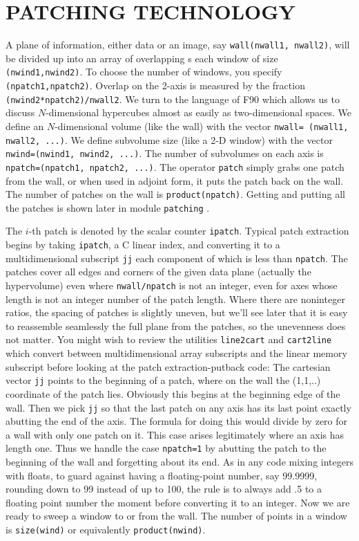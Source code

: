 \section{PATCHING TECHNOLOGY}
A plane of information, either data or an image,
say {\tt wall(nwall1, nwall2)}, will be divided up into
an array of overlapping s
each window of size {\tt (nwind1,nwind2)}.
To choose the number of windows, you specify {\tt (npatch1,npatch2)}.
Overlap on the 2-axis is measured by the fraction
{\tt (nwind2*npatch2)/nwall2}.
We turn to the language of F90 which allows us to discuss
$N$-dimensional hypercubes almost as easily as two-dimensional spaces.
We define an $N$-dimensional volume (like the wall) with the vector
\texttt{nwall= (nwall1, nwall2, ...)}.
We define subvolume size (like a 2-D window) with the vector
\texttt{nwind=(nwind1, nwind2, ...)}.
The number of subvolumes on each axis is
\texttt{npatch=(npatch1, npatch2, ...)}.
The operator
\texttt{patch} 
simply grabs one patch from the wall,
or when used in adjoint form, it puts the patch back on the wall.
The number of patches on the wall is
\texttt{product(npatch)}.
Getting and putting all the patches is shown later in module
\texttt{patching} .

\par
The $i$-th patch is denoted by the scalar counter \texttt{ipatch}.
Typical patch extraction begins by taking
\texttt{ipatch}, a C linear index,
and converting it to a multidimensional subscript \texttt{jj}
each component of which is less than \texttt{npatch}.
The patches cover all edges and corners of the given data plane
(actually the hypervolume)
even where
\texttt{nwall/npatch} is not an integer,
even for axes whose length is not an integer number of the patch length.
Where there are noninteger ratios,
the spacing of patches is slightly uneven,
but we'll see later that
it is easy to reassemble seamlessly the full plane from the patches,
so the unevenness does not matter.
You might wish to review the utilities
\texttt{line2cart} and
\texttt{cart2line} 
which convert between multidimensional array subscripts
and the linear memory subscript
before looking at the patch extraction-putback code:
The cartesian vector \texttt{jj}
points to the beginning of a patch, where on the wall
the (1,1,..) coordinate of the patch lies.
Obviously this begins at the beginning edge of the wall.
Then we pick \texttt{jj} so that the last patch on any axis
has its last point exactly abutting the end of the axis.
The formula for doing this would divide by zero
for a wall with only one patch on it.
This case arises legitimately where an axis has length one.
Thus we handle the case \texttt{npatch=1} by abutting the patch to the
beginning of the wall and forgetting about its end.
As in any code mixing integers with floats,
to guard against having a floating-point number, say 99.9999,
rounding down to 99 instead of up to 100,
the rule is to always add .5 to a floating point number
the moment before converting it to an integer.
Now we are ready to sweep a window to or from the wall.
The number of points in a window is 
\texttt{size(wind)} or equivalently
\texttt{product(nwind)}.


